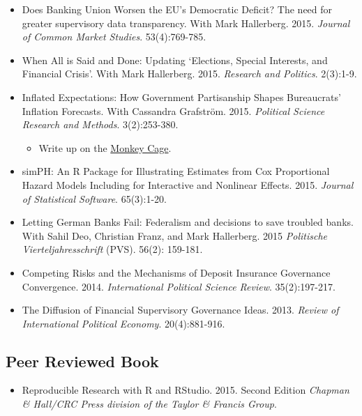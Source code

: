 \documentclass[a4paper]{article}
\begin{document}
{\begin{itemize}
    \item Does Banking Union Worsen the EU's Democratic Deficit? The need for greater supervisory data transparency. With Mark Hallerberg. 2015. {\emph{Journal of Common Market Studies}}. 53(4):769-785.

    \item When All is Said and Done: Updating `Elections, Special Interests, and Financial Crisis'. With Mark Hallerberg. 2015. \emph{Research and Politics}. 2(3):1-9.

    \item Inflated Expectations: How Government Partisanship Shapes Bureaucrats' Inflation Forecasts. With Cassandra Grafstr\"{o}m. 2015. {\emph{Political Science Research and Methods}}. 3(2):253-380.

    \begin{itemize}
        \item Write up on the \href{http://www.washingtonpost.com/blogs/monkey-cage/wp/2015/01/28/the-fed-cant-accurately-forecast-inflation-heres-why-this-may-hurt-democrats/}{Monkey Cage}.
    \end{itemize}

    \item simPH: An R Package for Illustrating Estimates from Cox Proportional Hazard Models Including for Interactive and Nonlinear Effects. 2015. {\emph{Journal of Statistical Software}}. 65(3):1-20.

    \item Letting German Banks Fail: Federalism and decisions to save troubled banks. With Sahil Deo, Christian Franz, and Mark Hallerberg. 2015 \emph{Politische Vierteljahresschrift} (PVS). 56(2): 159-181.

    \item Competing Risks and the Mechanisms of Deposit Insurance Governance Convergence. 2014. {\emph{International Political Science Review}}. 35(2):197-217.

    \item The Diffusion of Financial Supervisory Governance Ideas. 2013. {\emph{Review of International Political Economy}}. 20(4):881-916.

\end{itemize}

\subsection*{Peer Reviewed Book}

\begin{itemize}
    \item Reproducible Research with R and RStudio. 2015. Second Edition {\emph{Chapman \& Hall/CRC Press division of the Taylor \& Francis Group}}.


\end{itemize}}
\end{document}
